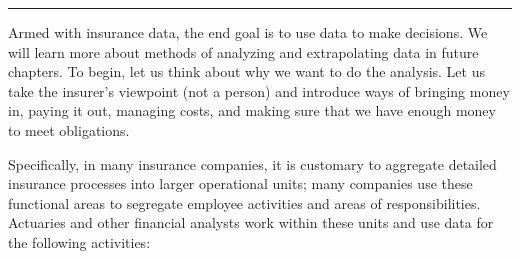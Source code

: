 \documentclass[]{book}
\theoremstyle{definition}
\theoremstyle{definition}
\theoremstyle{definition}
\theoremstyle{remark}
\begin{document}
\begin{center}\rule{0.5\linewidth}{\linethickness}\end{center}

Armed with insurance data, the end goal is to use data to make
decisions. We will learn more about methods of analyzing and
extrapolating data in future chapters. To begin, let us think about why
we want to do the analysis. Let us take the insurer's viewpoint (not a
person) and introduce ways of bringing money in, paying it out, managing
costs, and making sure that we have enough money to meet obligations.

Specifically, in many insurance companies, it is customary to aggregate
detailed insurance processes into larger operational units; many
companies use these functional areas to segregate employee activities
and areas of responsibilities. Actuaries and other financial analysts
work within these units and use data for the following activities:
\end{document}
